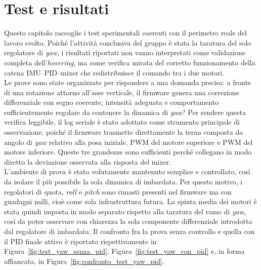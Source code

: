\documentclass[11pt]{report}
\begin{document}
	
	\chapter{Test e risultati}
	Questo capitolo raccoglie i test sperimentali coerenti con il perimetro reale del lavoro svolto. Poiché l'attività conclusiva del gruppo è stata la taratura del solo regolatore di \textit{yaw}, i risultati riportati non vanno interpretati come validazione completa dell'\textit{hovering}, ma come verifica mirata del corretto funzionamento della catena IMU--PID--mixer che redistribuisce il comando tra i due motori.\\
	Le prove sono state organizzate per rispondere a una domanda precisa: a fronte di una rotazione attorno all'asse verticale, il firmware genera una correzione differenziale con segno coerente, intensità adeguata e comportamento sufficientemente regolare da contenere la dinamica di \textit{yaw}? Per rendere questa verifica leggibile, il log seriale è stato adottato come strumento principale di osservazione, poiché il firmware trasmette direttamente la terna composta da angolo di \textit{yaw} relativo alla posa iniziale, PWM del motore superiore e PWM del motore inferiore. Queste tre grandezze sono sufficienti perché collegano in modo diretto la deviazione osservata alla risposta del mixer.\\
	L'ambiente di prova è stato volutamente mantenuto semplice e controllato, così da isolare il più possibile la sola dinamica di imbardata. Per questo motivo, i regolatori di quota, \textit{roll} e \textit{pitch} sono rimasti presenti nel firmware ma con guadagni nulli, cioè come sola infrastruttura futura. La spinta media dei motori è stata quindi imposta in modo separato rispetto alla taratura del ramo di \textit{yaw}, così da poter osservare con chiarezza la sola componente differenziale introdotta dal regolatore di imbardata. Il confronto fra la prova senza controllo e quella con il PID finale attivo è riportato rispettivamente in Figura~\ref{fig:test_yaw_senza_pid}, Figura~\ref{fig:test_yaw_con_pid} e, in forma affiancata, in Figura~\ref{fig:confronto_test_yaw_pid}.
	
\end{document}
